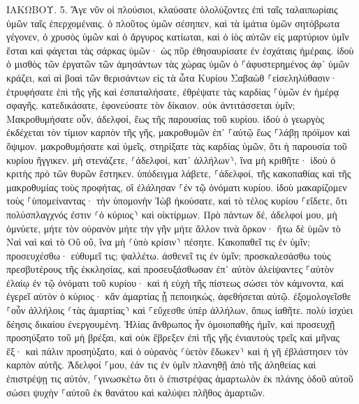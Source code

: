 \documentclass[twoside, 9pt]{extreport}
\begin{document}
ΙΑΚΩΒΟΥ.
5.
Ἄγε νῦν οἱ πλούσιοι, κλαύσατε ὀλολύζοντες ἐπὶ ταῖς ταλαιπωρίαις ὑμῶν ταῖς ἐπερχομέναις. 
ὁ πλοῦτος ὑμῶν σέσηπεν, καὶ τὰ ἱμάτια ὑμῶν σητόβρωτα γέγονεν, 
ὁ χρυσὸς ὑμῶν καὶ ὁ ἄργυρος κατίωται, καὶ ὁ ἰὸς αὐτῶν εἰς μαρτύριον ὑμῖν ἔσται καὶ φάγεται τὰς σάρκας ὑμῶν· ὡς πῦρ ἐθησαυρίσατε ἐν ἐσχάταις ἡμέραις. 
ἰδοὺ ὁ μισθὸς τῶν ἐργατῶν τῶν ἀμησάντων τὰς χώρας ὑμῶν ὁ ⸀ἀφυστερημένος ἀφ᾽ ὑμῶν κράζει, καὶ αἱ βοαὶ τῶν θερισάντων εἰς τὰ ὦτα Κυρίου Σαβαὼθ ⸀εἰσεληλύθασιν· 
ἐτρυφήσατε ἐπὶ τῆς γῆς καὶ ἐσπαταλήσατε, ἐθρέψατε τὰς καρδίας ⸀ὑμῶν ἐν ἡμέρᾳ σφαγῆς. 
κατεδικάσατε, ἐφονεύσατε τὸν δίκαιον. οὐκ ἀντιτάσσεται ὑμῖν; 
Μακροθυμήσατε οὖν, ἀδελφοί, ἕως τῆς παρουσίας τοῦ κυρίου. ἰδοὺ ὁ γεωργὸς ἐκδέχεται τὸν τίμιον καρπὸν τῆς γῆς, μακροθυμῶν ἐπ᾽ ⸀αὐτῷ ἕως ⸀λάβῃ πρόϊμον καὶ ὄψιμον. 
μακροθυμήσατε καὶ ὑμεῖς, στηρίξατε τὰς καρδίας ὑμῶν, ὅτι ἡ παρουσία τοῦ κυρίου ἤγγικεν. 
μὴ στενάζετε, ⸂ἀδελφοί, κατ᾽ ἀλλήλων⸃, ἵνα μὴ κριθῆτε· ἰδοὺ ὁ κριτὴς πρὸ τῶν θυρῶν ἕστηκεν. 
ὑπόδειγμα λάβετε, ⸀ἀδελφοί, τῆς κακοπαθίας καὶ τῆς μακροθυμίας τοὺς προφήτας, οἳ ἐλάλησαν ⸀ἐν τῷ ὀνόματι κυρίου. 
ἰδοὺ μακαρίζομεν τοὺς ⸀ὑπομείναντας· τὴν ὑπομονὴν Ἰὼβ ἠκούσατε, καὶ τὸ τέλος κυρίου ⸀εἴδετε, ὅτι πολύσπλαγχνός ἐστιν ⸂ὁ κύριος⸃ καὶ οἰκτίρμων. 
Πρὸ πάντων δέ, ἀδελφοί μου, μὴ ὀμνύετε, μήτε τὸν οὐρανὸν μήτε τὴν γῆν μήτε ἄλλον τινὰ ὅρκον· ἤτω δὲ ὑμῶν τὸ Ναὶ ναὶ καὶ τὸ Οὒ οὔ, ἵνα μὴ ⸂ὑπὸ κρίσιν⸃ πέσητε. 
Κακοπαθεῖ τις ἐν ὑμῖν; προσευχέσθω· εὐθυμεῖ τις; ψαλλέτω. 
ἀσθενεῖ τις ἐν ὑμῖν; προσκαλεσάσθω τοὺς πρεσβυτέρους τῆς ἐκκλησίας, καὶ προσευξάσθωσαν ἐπ᾽ αὐτὸν ἀλείψαντες ⸀αὐτὸν ἐλαίῳ ἐν τῷ ὀνόματι τοῦ κυρίου· 
καὶ ἡ εὐχὴ τῆς πίστεως σώσει τὸν κάμνοντα, καὶ ἐγερεῖ αὐτὸν ὁ κύριος· κἂν ἁμαρτίας ᾖ πεποιηκώς, ἀφεθήσεται αὐτῷ. 
ἐξομολογεῖσθε ⸀οὖν ἀλλήλοις ⸂τὰς ἁμαρτίας⸃ καὶ ⸀εὔχεσθε ὑπὲρ ἀλλήλων, ὅπως ἰαθῆτε. πολὺ ἰσχύει δέησις δικαίου ἐνεργουμένη. 
Ἠλίας ἄνθρωπος ἦν ὁμοιοπαθὴς ἡμῖν, καὶ προσευχῇ προσηύξατο τοῦ μὴ βρέξαι, καὶ οὐκ ἔβρεξεν ἐπὶ τῆς γῆς ἐνιαυτοὺς τρεῖς καὶ μῆνας ἕξ· 
καὶ πάλιν προσηύξατο, καὶ ὁ οὐρανὸς ⸂ὑετὸν ἔδωκεν⸃ καὶ ἡ γῆ ἐβλάστησεν τὸν καρπὸν αὐτῆς. 
Ἀδελφοί ⸀μου, ἐάν τις ἐν ὑμῖν πλανηθῇ ἀπὸ τῆς ἀληθείας καὶ ἐπιστρέψῃ τις αὐτόν, 
⸀γινωσκέτω ὅτι ὁ ἐπιστρέψας ἁμαρτωλὸν ἐκ πλάνης ὁδοῦ αὐτοῦ σώσει ψυχὴν ⸀αὐτοῦ ἐκ θανάτου καὶ καλύψει πλῆθος ἁμαρτιῶν. 
\end{document}
